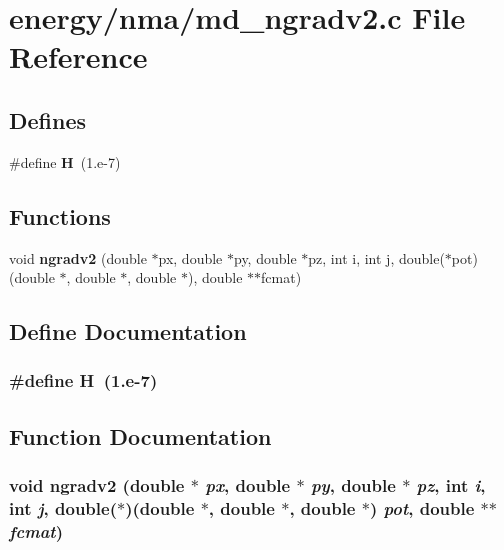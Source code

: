 \section{energy/nma/md\_\-ngradv2.c File Reference}
\label{md__ngradv2_8c}
\subsection*{Defines}
\begin{CompactItemize}
\item 
\#define {\bf H}~(1.e-7)
\end{CompactItemize}
\subsection*{Functions}
\begin{CompactItemize}
\item 
void {\bf ngradv2} (double $\ast$px, double $\ast$py, double $\ast$pz, int i, int j, double($\ast$pot)(double $\ast$, double $\ast$, double $\ast$), double $\ast$$\ast$fcmat)
\end{CompactItemize}


\subsection{Define Documentation}
\subsubsection{\setlength{\rightskip}{0pt plus 5cm}\#define H~(1.e-7)}\label{md__ngradv2_8c_bec92cc72a096640b821b8cd56a02495}




\subsection{Function Documentation}
\subsubsection{\setlength{\rightskip}{0pt plus 5cm}void ngradv2 (double $\ast$ {\em px}, double $\ast$ {\em py}, double $\ast$ {\em pz}, int {\em i}, int {\em j}, double($\ast$)(double $\ast$, double $\ast$, double $\ast$) {\em pot}, double $\ast$$\ast$ {\em fcmat})}\label{md__ngradv2_8c_208f191ef8e4de0e979fd739a12748e0}


